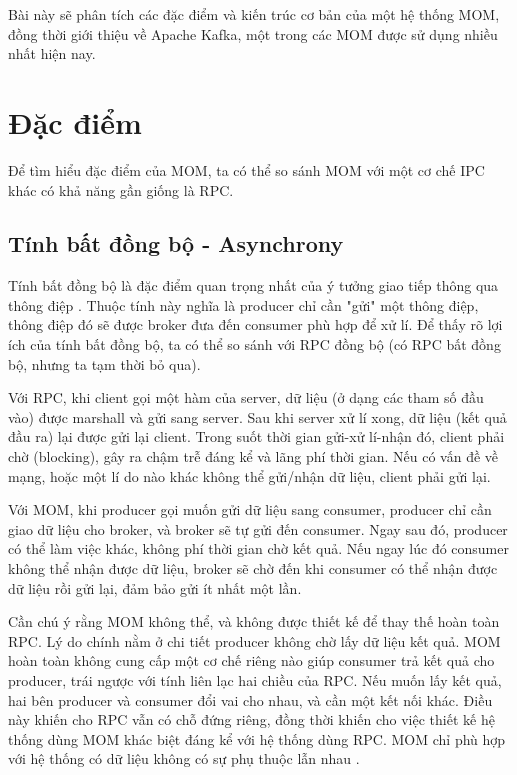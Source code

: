 \documentclass{article}
\begin{document}
Bài này sẽ phân tích các đặc điểm và kiến trúc cơ bản của một hệ thống MOM, đồng
thời giới thiệu về Apache Kafka, một trong các MOM được sử dụng nhiều nhất hiện
nay.

\section{Đặc điểm}

Để tìm hiểu đặc điểm của MOM, ta có thể so sánh MOM với một cơ chế IPC khác
có khả năng gần giống là RPC.

\subsection{Tính bất đồng bộ - Asynchrony}

Tính bất đồng bộ là đặc điểm quan trọng nhất của ý tưởng giao tiếp thông qua
thông điệp \cite{inbook}. Thuộc tính này nghĩa là producer chỉ cần "gửi" một
thông điệp, thông điệp đó sẽ được broker đưa đến consumer phù hợp để xử lí. Để
thấy rõ lợi ích của tính bất đồng bộ, ta có thể so sánh với RPC đồng bộ (có RPC
bất đồng bộ, nhưng ta tạm thời bỏ qua).

Với RPC, khi client gọi một hàm của server, dữ liệu (ở dạng các tham số đầu vào)
được marshall và gửi sang server. Sau khi server xử lí xong, dữ liệu (kết quả
đầu ra) lại được gửi lại client. Trong suốt thời gian gửi-xử lí-nhận đó, client
phải chờ (blocking), gây ra chậm trễ đáng kể và lãng phí thời gian. Nếu có vấn
đề về mạng, hoặc một lí do nào khác không thể gửi/nhận dữ liệu, client phải gửi
lại.

Với MOM, khi producer gọi muốn gửi dữ liệu sang consumer, producer chỉ cần
giao dữ liệu cho broker, và broker sẽ tự gửi đến consumer. Ngay sau đó, producer
có thể làm việc khác, không phí thời gian chờ kết quả. Nếu ngay lúc đó consumer
không thể nhận được dữ liệu, broker sẽ chờ đến khi consumer có thể nhận được dữ
liệu rồi gửi lại, đảm bảo gửi ít nhất một lần.

Cần chú ý rằng MOM không thể, và không được thiết kế để thay thế hoàn toàn RPC.
Lý do chính nằm ở chi tiết producer không chờ lấy dữ liệu kết quả. MOM hoàn
toàn không cung cấp một cơ chế riêng nào giúp consumer trả kết quả cho producer,
trái ngược với tính liên lạc hai chiều của RPC. Nếu muốn lấy kết quả, hai bên
producer và consumer đổi vai cho nhau, và cần một kết nối khác. Điều này khiến
cho RPC vẫn có chỗ đứng riêng, đồng thời khiến cho việc thiết kế hệ thống dùng
MOM khác biệt đáng kể với hệ thống dùng RPC. MOM chỉ phù hợp với hệ thống có dữ
liệu không có sự phụ thuộc lẫn nhau \cite{ejb3_c4}.
\end{document}
